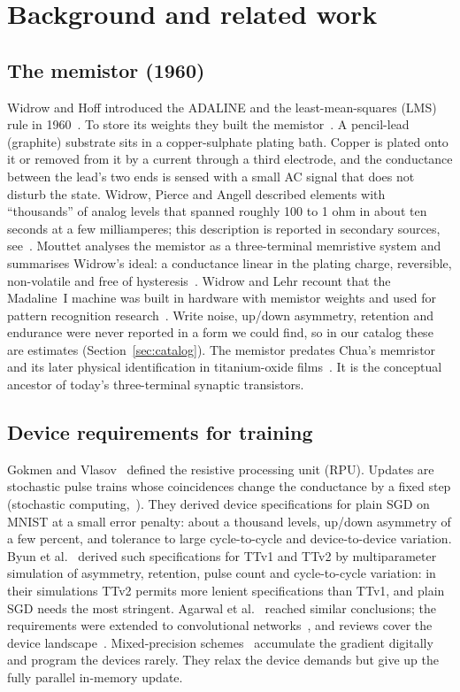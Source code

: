 \section{Background and related work}\label{sec:background}

\subsection{The memistor (1960)}
Widrow and Hoff introduced the ADALINE and the least-mean-squares (LMS) rule in 1960~\cite{widrow1960switching}. To store its
weights they built the memistor~\cite{widrow1960adaline}. A pencil-lead (graphite) substrate sits in a copper-sulphate plating
bath. Copper is plated onto it or removed from it by a current through a third electrode, and the conductance between the
lead's two ends is sensed with a small AC signal that does not disturb the state. Widrow, Pierce and Angell described elements
with ``thousands'' of analog levels that spanned roughly 100 to 1 ohm in about ten seconds at a few milliamperes; this description
is reported in secondary sources, see~\cite{mouttet2010}. Mouttet analyses the memistor as a three-terminal memristive system
and summarises Widrow's ideal: a conductance linear in the plating charge, reversible, non-volatile and free of
hysteresis~\cite{mouttet2010}. Widrow and Lehr recount that the Madaline~I machine was built in hardware with memistor weights and used for pattern
recognition research~\cite{widrow1990}.
Write noise, up/down asymmetry, retention and endurance were never reported in a form we could find, so in our catalog these
are estimates (Section~\ref{sec:catalog}). The memistor predates Chua's memristor~\cite{chua1971} and its later physical
identification in titanium-oxide films~\cite{strukov2008}. It is the conceptual ancestor of today's three-terminal synaptic
transistors.

\subsection{Device requirements for training}
Gokmen and Vlasov~\cite{gokmen2016} defined the resistive processing unit (RPU). Updates are stochastic pulse trains whose
coincidences change the conductance by a fixed step (stochastic computing,~\cite{gaines1967}). They derived device
specifications for plain SGD on MNIST at a small error penalty: about a thousand levels, up/down asymmetry of a few percent, and
tolerance to large cycle-to-cycle and device-to-device variation. Byun et al.~\cite{byun2024} derived such specifications for
TTv1 and TTv2 by multiparameter simulation of asymmetry, retention, pulse count and cycle-to-cycle variation: in their
simulations TTv2 permits more lenient specifications than TTv1, and plain SGD needs the most stringent. Agarwal et al.~\cite{agarwal2016} reached similar conclusions;
the requirements were extended to convolutional networks~\cite{gokmen2017cnn}, and reviews cover the device
landscape~\cite{burr2017,ielmini2018,sebastian2020,haensch2019}. Mixed-precision schemes~\cite{nandakumar2020} accumulate the
gradient digitally and program the devices rarely. They relax the device demands but give up the fully parallel in-memory update.

